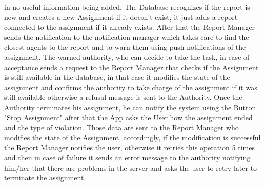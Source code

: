 in no useful information being added. The Database recognizes if the report is new and creates a new
Assignment if it doesn’t exist, it just adds a report connected to the assignment if it already exists. After
that the Report Manager sends the notification to the notification manager which takes care to find the
closest agents to the report and to warn them using push notifications of the assignment. The warned
authority, who can decide to take the task, in case of acceptance sends a request to the Report Manager
that checks if the Assignment is still available in the database, in that case it modifies the state of the
assignment and confirms the authority to take charge of the assignment if it was still available otherwise
a refusal message is sent to the Authority. Once the Authority terminates his assignment, he can notify
the system using the Button "Stop Assignment" after that the App asks the User how the assignment
ended and the type of violation. Those data are sent to the Report Manager who modifies the state of the
Assignment, accordingly, if the modification is successful the Report Manager notifies the user, otherwise
it retries this operation 5 times and then in case of failure it sends an error message to the authority
notifying him/her that there are problems in the server and asks the user to retry later to terminate the
assignment.
